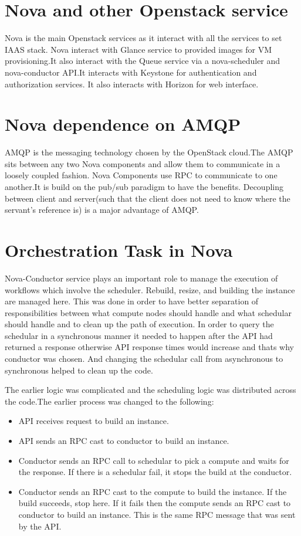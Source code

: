 \documentclass[9pt,twocolumn,twoside]{styles/osajnl}
\begin{document}
\section{Nova and other Openstack service}

Nova is the main Openstack services as it interact with all the services to set IAAS stack.
Nova interact with Glance service to provided images for VM provisioning.It also interact with the Queue service via a nova-scheduler and nova-conductor API.It interacts with Keystone for authentication and authorization services. It also interacts with Horizon for web interface.

\section{Nova dependence on AMQP}
AMQP is the messaging technology chosen by the OpenStack cloud.The AMQP sits between any two Nova components and allow them to communicate in a loosely coupled fashion. Nova Components use RPC to communicate to one another.It is build on the pub/sub paradigm to have the benefits. Decoupling between client and server(such that the client does not need to know where the servant's reference is) is a major advantage of AMQP\cite{www-nova-amqp}.

\section{Orchestration Task in Nova}
Nova-Conductor service plays an important role to manage the execution of workflows which involve the scheduler. Rebuild, resize, and building the instance are managed here. This was done in order to have better separation of responsibilities between what compute nodes should handle and what schedular should handle and to clean up the path of execution. In order to query the schedular in a synchronous manner it needed to happen after the API had returned a response otherwise API response times would increase and thats why conductor was chosen. And changing the schedular call from asynchronous to synchronous helped to clean up the code\cite{www-nova-orchestrator}.

The earlier logic was complicated and the scheduling logic was distributed across the code.The earlier process was changed to the following:

\begin{itemize}
\item API receives request to build an instance.
\item API sends an RPC cast to conductor to build an instance.
\item Conductor sends an RPC call to schedular to pick a compute and waits for the response. If there is a schedular fail, it stops the build at the conductor.
\item Conductor sends an RPC cast to the compute to build the instance. If the build succeeds, stop here. If it fails then the compute sends an RPC cast to conductor to build an instance. This is the same RPC message that was sent by the API.

\end{itemize}
\end{document}
